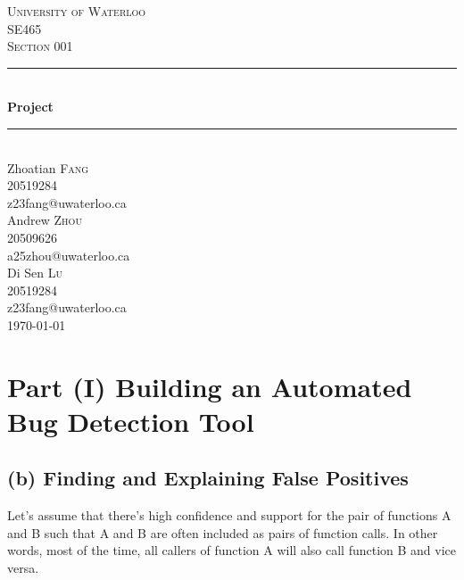 \documentclass{article}
\begin{document}

\begin{titlepage}

\newcommand{\HRule}{\rule{\linewidth}{0.5mm}}

\center

\textsc{\huge University of Waterloo}\\[2cm]
\textsc{\LARGE SE465}\\[1cm] 
\textsc{\Large Section 001}\\[1cm] 

\HRule \\[0.5cm]
{ \Huge \bfseries Project}\\[0.5cm] 
\HRule \\[0.5cm]
 
\LARGE Zhoatian \textsc{Fang} \\  [0.5cm]
\Large 20519284 \\  [0.5cm]
z23fang@uwaterloo.ca \\ [1.5cm]

\LARGE Andrew \textsc{Zhou} \\  [0.5cm]
\Large 20509626 \\  [0.5cm]
a25zhou@uwaterloo.ca \\ [1.5cm]

\LARGE Di Sen \textsc{Lu} \\  [0.5cm]
\Large 20519284 \\  [0.5cm]
z23fang@uwaterloo.ca \\ [1.5cm]

{\Large \today}\\

\vfill 

\end{titlepage}

\section*{Part (I) Building an Automated Bug Detection Tool}

\subsection*{(b) Finding and Explaining False Positives}
Let's assume that there's high confidence and support for the pair of functions A and B such that A and B are often included as pairs of function calls. In other words, most of the time, all callers of function A will also call function B and vice versa. \\
\end{document}

